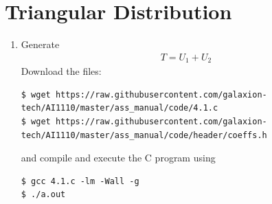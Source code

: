 \documentclass[journal,12pt,twocolumn]{IEEEtran}
\renewcommand\thesection{\arabic{section}}
\begin{document}
\section{Triangular Distribution }
\begin{enumerate}[label=\thesection.\arabic*.,ref=\thesection.\theenumi]
    
    \item Generate 
    \begin{align}
        T=U_1+U_2
    \end{align} 
    \solution Download the files:
    \begin{lstlisting}
$ wget https://raw.githubusercontent.com/galaxion-tech/AI1110/master/ass_manual/code/4.1.c
$ wget https://raw.githubusercontent.com/galaxion-tech/AI1110/master/ass_manual/code/header/coeffs.h
    \end{lstlisting}
    and compile and execute the C program using
    \begin{lstlisting}
$ gcc 4.1.c -lm -Wall -g
$ ./a.out
    \end{lstlisting}
    

\end{enumerate}
\end{document}
